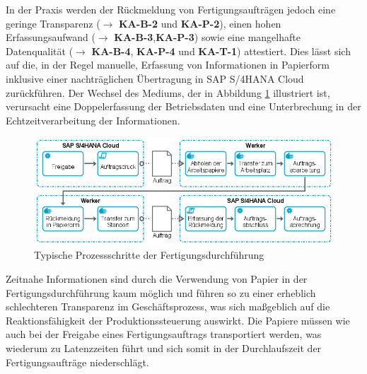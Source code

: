 In der Praxis werden der Rückmeldung von Fertigungsaufträgen jedoch eine geringe Transparenz
($\rightarrow$ \textbf{KA-B-2} und \textbf{KA-P-2}), einen hohen Erfassungsaufwand
($\rightarrow$ \textbf{KA-B-3},\textbf{KA-P-3}) sowie eine mangelhafte Datenqualität
($\rightarrow$ \textbf{KA-B-4}, \textbf{KA-P-4} und \textbf{KA-T-1}) attestiert. 
Dies lässt sich auf die, in der Regel manuelle, Erfassung von Informationen in Papierform inklusive einer nachträglichen Übertragung in SAP S/4HANA Cloud zurückführen. Der Wechsel des Mediums, der in Abbildung \ref{fig:Typische Prozessschritte der Fertigungsdurchführung} illustriert ist, verursacht eine Doppelerfassung der Betriebsdaten und eine Unterbrechung in der Echtzeitverarbeitung der Informationen. 

\begin{figure}[H]
	\centering 
    \includegraphics[width=\textwidth]{img/paper.png}	
    \caption[Typische Prozessschritte der Fertigungsdurchführung]
    {Typische Prozessschritte der Fertigungsdurchführung\protect\footnotemark}
    \label{fig:Typische Prozessschritte der Fertigungsdurchführung}
\end{figure}

Zeitnahe Informationen sind durch die Verwendung von Papier in der Fertigungsdurchführung kaum möglich und führen so zu einer erheblich schlechteren Transparenz im Geschäftsprozess, was sich maßgeblich auf die Reaktionsfähigkeit der Produktionssteuerung auswirkt. Die Papiere müssen wie auch bei der Freigabe eines Fertigungsauftrags transportiert werden, was wiederum zu Latenzzeiten führt und sich somit in der Durchlaufszeit der Fertigungsaufträge niederschlägt.